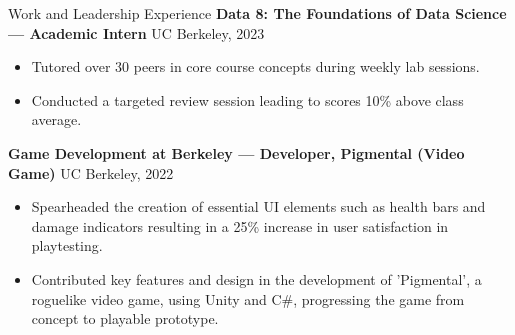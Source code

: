\documentclass{resume}
\begin{document}
\begin{rSection}{Work and Leadership Experience}
\textbf{Data 8: The Foundations of Data Science — Academic Intern} \hfill UC Berkeley, 2023
\begin{itemize}
  \item Tutored over 30 peers in core course concepts during weekly lab sessions.
  \item Conducted a targeted review session leading to scores 10\% above class average.
\end{itemize}

\textbf{Game Development at Berkeley — Developer, Pigmental (Video Game)} \hfill UC Berkeley, 2022
\begin{itemize}
  \item Spearheaded the creation of essential UI elements such as health bars and damage indicators resulting in a 25\% increase in user satisfaction in playtesting.
  \item Contributed key features and design in the development of 'Pigmental', a roguelike video game, using Unity and C\#, progressing the game from concept to playable prototype.
\end{itemize}

\end{rSection}

\end{document}
